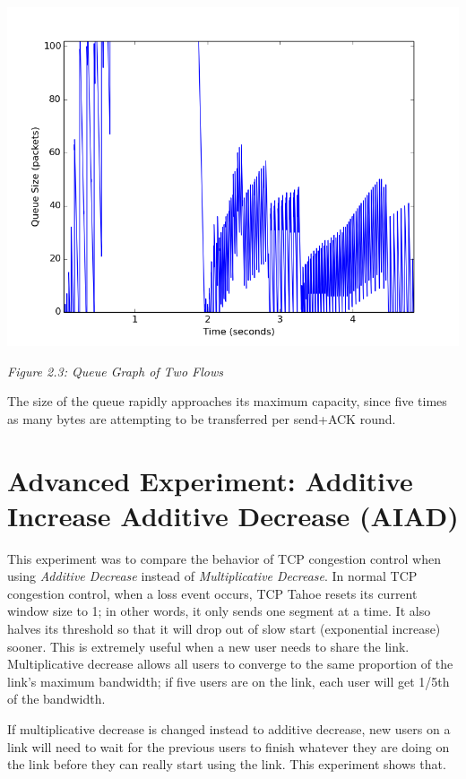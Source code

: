 \documentclass[11pt]{article}
\begin{document}
\includegraphics[width=17cm]{outputs/fiveflows/fiveflows_queue.png}

\centerline{\emph{Figure 2.3: Queue Graph of Two Flows}}

The size of the queue rapidly approaches its maximum capacity, since five times as many bytes are attempting to be transferred per send+ACK round.




\section{Advanced Experiment: Additive Increase Additive Decrease (AIAD)}

This experiment was to compare the behavior of TCP congestion control when using \emph{Additive Decrease} instead of \emph {Multiplicative Decrease}. In normal TCP congestion control, when a loss event occurs, TCP Tahoe resets its current window size to 1; in other words, it only sends one segment at a time. It also halves its threshold so that it will drop out of slow start (exponential increase) sooner. This is extremely useful when a new user needs to share the link. Multiplicative decrease allows all users to converge to the same proportion of the link's maximum bandwidth; if five users are on the link, each user will get 1/5th of the bandwidth. 

If multiplicative decrease is changed instead to additive decrease, new users on a link will need to wait for the previous users to finish whatever they are doing on the link before they can really start using the link. This experiment shows that.
\end{document}
